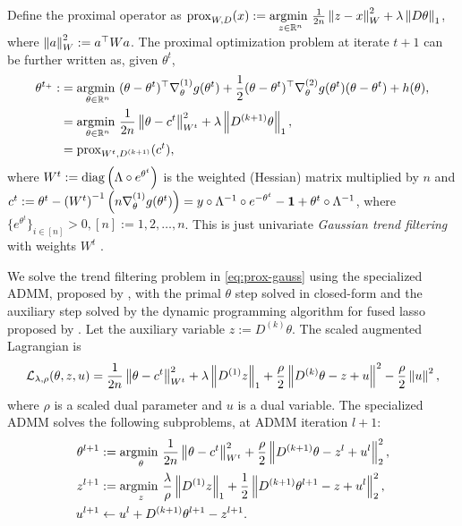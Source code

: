Define the proximal operator as $\mathrm{prox}_{W,D} (x) := \underset{z\in\mathbb{R}^n}{\operatorname*{argmin}\ } \frac{1}{2n} \left\lVert z-x \right\rVert_W^2 + \lambda \left\lVert D\theta \right\rVert_1$, where $\left\lVert a \right\rVert_{W}^2 := a^{\top} {W} a$. The proximal optimization problem at iterate $t+1$ can be further written as, given $\theta^t$,
\begin{equation} \label{eq:prox-gauss}
    \begin{split}
        \theta^{t_+} :&= \underset{\theta\in\mathbb{R}^n}{\operatorname*{argmin}\ } (\theta - \theta^t)^{\top} \nabla^{(1)}_{\theta} g(\theta^t) + \frac{1}{2} (\theta - \theta^t)^{\top} \nabla^{(2)}_{\theta} g(\theta^t) (\theta - \theta^t) + h(\theta), \\
        &= \underset{\theta\in\mathbb{R}^n}{\operatorname*{argmin}\ } \frac{1}{2n} \left\lVert \theta - c^{t} \right\rVert_{W^t}^2 + \lambda \left\lVert D^{(k+1)}\theta \right\rVert_1, \\
        &= \mathrm{prox}_{W^t,D^{(k+1)}} (c^{t}),
    \end{split}
\end{equation}
where $W^t := \operatorname*{diag} \left(\Lambda\circ e^{\theta^t}\right)$ is the weighted (Hessian) matrix multiplied by $n$ and ${c^t} := \theta^t - \left(W^{t}\right)^{-1} \left(n\nabla^{(1)}_{\theta} g(\theta^t)\right) = y\circ \Lambda^{-1}\circ e^{-\theta^t} - \boldsymbol{1} + \theta^t\circ \Lambda^{-1}$, where $\{e^{\theta^t}\}_{i\in[n]} > 0, [n]:=1,2,\dots,n$.
This is just univariate \textit{Gaussian trend filtering} with weights $W^t$ \citep{tibshirani2014adaptive}. 

We solve the trend filtering problem in \eqref{eq:prox-gauss} using the specialized ADMM, proposed by \cite{ramdas2016fast}, with the primal $\theta$ step solved in closed-form and the auxiliary step solved by the dynamic programming algorithm for fused lasso proposed by \cite{johnson2013dynamic}. Let the auxiliary variable $z:= D^{(k)}\theta$. The scaled augmented Lagrangian is $$\mathcal{L}_{\lambda, \rho}(\theta, z, u) = \frac{1}{2n} \left\lVert \theta - c^{t} \right\rVert_{W^t}^2 + \lambda \left\lVert D^{(1)}z \right\rVert_1 + \frac{\rho}{2} \left\lVert D^{(k)}\theta - z + u \right\rVert^2 - \frac{\rho}{2} \left\lVert u \right\rVert^2, $$ where $\rho$ is a scaled dual parameter and $u$ is a dual variable. The specialized ADMM solves the following subproblems, at ADMM iteration $l+1$: 
\begin{equation}
  \begin{split}
      \theta^{l+1} &:= \underset{\theta}{\operatorname*{argmin}\ } \frac{1}{2n} \left\lVert \theta - c^{t} \right\rVert_{W^t}^2 + \frac{\rho}{2} \left\lVert D^{(k+1)} \theta - z^l + u^l \right\rVert_2^2, \\
      z^{l+1} &:= \underset{z}{\operatorname*{argmin}\ } \frac{\lambda}{\rho} \left\lVert D^{(1)} z \right\rVert_1 + \frac{1}{2} \left\lVert D^{(k+1)} \theta^{l+1} - z + u^l \right\rVert_2^2, \\
      u^{l+1} &\leftarrow u^l + D^{(k+1)} \theta^{l+1} - z^{l+1}.
  \end{split}
\end{equation}

